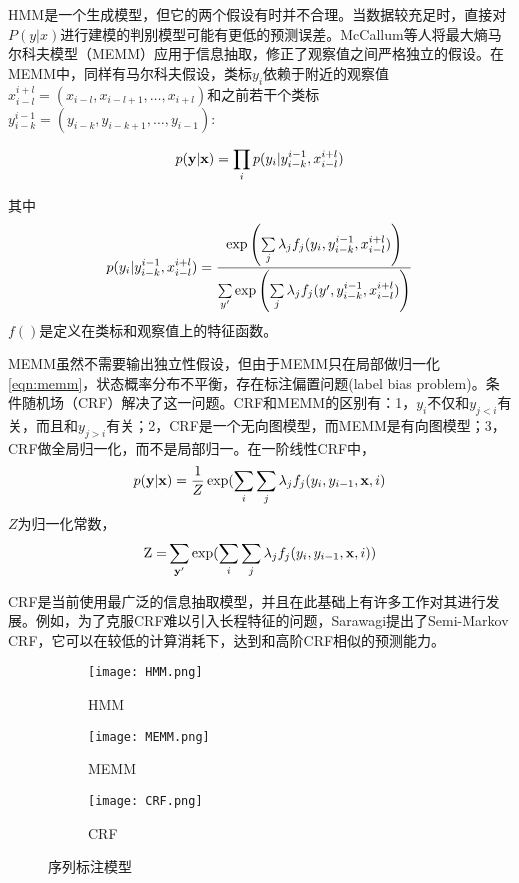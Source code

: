 HMM是一个生成模型，但它的两个假设有时并不合理。当数据较充足时，直接对$P(y|x)$进行建模的判别模型可能有更低的预测误差。McCallum等人将最大熵马尔科夫模型（MEMM）应用于信息抽取\cite{mccallum2000maximum}，修正了观察值之间严格独立的假设。在MEMM中，同样有马尔科夫假设，类标$y_i$依赖于附近的观察值$x_{i - l}^{i + l} = ({x_{i - l}},{x_{i - l + 1}}, \ldots ,{x_{i + l}})$和之前若干个类标$y_{i - k}^{i - 1} = ({y_{i - k}},{y_{i - k + 1}}, \ldots ,{y_{i - 1}})$:

\[p({\bf{y}}|{\bf{x}}) = \prod\limits_i {p({y_i}|y_{i - k}^{i - 1},x_{i - l}^{i + l})} \]

其中
\begin{equation}
{p({y_i}|y_{i - k}^{i - 1},x_{i - l}^{i + l})} = \frac{{\exp \left( {\sum\limits_j {{\lambda _j}{f_j}({y_i}} ,y_{i - k}^{i - 1},x_{i - l}^{i{\rm{ + }}l})} \right)}}{{\sum\limits_{y'} {\exp \left( {\sum\limits_j {{\lambda _j}{f_j}(y'} ,y_{i - k}^{i - 1},x_{i - l}^{i{\rm{ + }}l})} \right)} }} 
\label{eqn:memm}
\end{equation}
$f()$是定义在类标和观察值上的特征函数。

MEMM虽然不需要输出独立性假设，但由于MEMM只在局部做归一化\ref{eqn:memm}，状态概率分布不平衡，存在标注偏置问题(label bias problem)。条件随机场（CRF）\cite{lafferty2001conditional}解决了这一问题。CRF和MEMM的区别有：1，$y_i$不仅和$y_{j<i}$有关，而且和$y_{j>i}$有关；2，CRF是一个无向图模型，而MEMM是有向图模型；3，CRF做全局归一化，而不是局部归一。在一阶线性CRF中，
\[ p({\bf{y}}|{\bf{x}}) = \frac{1}{Z}\exp (\sum\limits_i {\sum\limits_j {{\lambda _j}{f_j}({y_i},{y_{i - 1}},{\bf{x}},i)} } \]
$Z$为归一化常数，	
\[{\rm{Z = }}\sum\limits_{{\bf{y'}}} {\exp (\sum\limits_i {\sum\limits_j {{\lambda _j}{f_j}({y_i},{y_{i - 1}},{\bf{x}},i)} } }) \]

CRF是当前使用最广泛的信息抽取模型，并且在此基础上有许多工作对其进行发展。例如，为了克服CRF难以引入长程特征的问题，Sarawagi\cite{sarawagi2004semi}提出了Semi-Markov CRF，它可以在较低的计算消耗下，达到和高阶CRF相似的预测能力。

\begin{figure}[h]
\centering
\begin{subfigure}{0.3\textwidth}
\texttt{[image: HMM.png]}
\caption{HMM}
\end{subfigure}

\begin{subfigure}{0.3\textwidth}
\texttt{[image: MEMM.png]}
\caption{MEMM}
\end{subfigure}

\begin{subfigure}{0.3\textwidth}
\texttt{[image: CRF.png]}
\caption{CRF}
\end{subfigure}

\caption{序列标注模型}
\label{fig:seq_label_model}
\end{figure}

